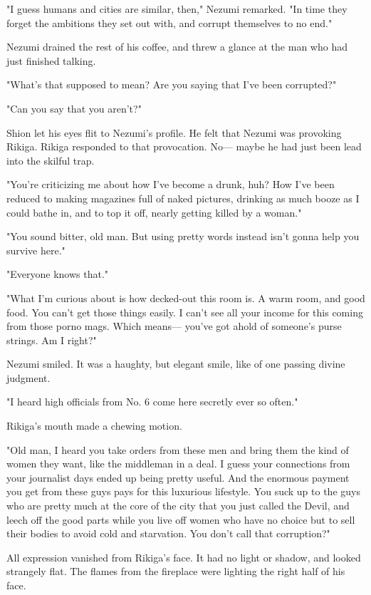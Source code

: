 "I guess humans and cities are similar, then," Nezumi remarked. "In time
they forget the ambitions they set out with, and corrupt themselves to
no end."

Nezumi drained the rest of his coffee, and threw a glance at the man who
had just finished talking.

"What's that supposed to mean? Are you saying that I've been corrupted?"

"Can you say that you aren't?"

Shion let his eyes flit to Nezumi's profile. He felt that Nezumi was
provoking Rikiga. Rikiga responded to that provocation. No--- maybe he had
just been lead into the skilful trap.

"You're criticizing me about how I've become a drunk, huh? How I've been
reduced to making magazines full of naked pictures, drinking as much
booze as I could bathe in, and to top it off, nearly getting killed by a
woman."

"You sound bitter, old man. But using pretty words instead isn't gonna
help you survive here."

"Everyone knows that."

"What I'm curious about is how decked-out this room is. A warm room, and
good food. You can't get those things easily. I can't see all your
income for this coming from those porno mags. Which means--- you've got
ahold of someone's purse strings. Am I right?"

Nezumi smiled. It was a haughty, but elegant smile, like of one passing
divine judgment.

"I heard high officials from No. 6 come here secretly ever so often."

Rikiga's mouth made a chewing motion.

"Old man, I heard you take orders from these men and bring them the kind
of women they want, like the middleman in a deal. I guess your
connections from your journalist days ended up being pretty useful. And
the enormous payment you get from these guys pays for this luxurious
lifestyle. You suck up to the guys who are pretty much at the core of
the city that you just called the Devil, and leech off the good parts
while you live off women who have no choice but to sell their bodies to
avoid cold and starvation. You don't call that corruption?"

All expression vanished from Rikiga's face. It had no light or shadow,
and looked strangely flat. The flames from the fireplace were lighting
the right half of his face.

